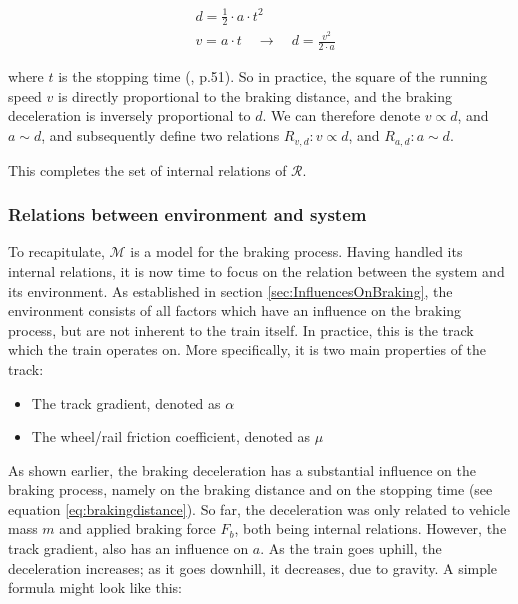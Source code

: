 \begin{equation}
\label{eq:brakingdistance}
\begin{aligned}
&d=\frac{1}{2} \cdot a \cdot t^{2} \\
&v=a \cdot t \quad \rightarrow \quad d=\frac{v^{2}}{2 \cdot a}
\end{aligned}
\end{equation}

\noindent
where $t$ is the stopping time (\cite{Cruceanu2012}, p.51). So in practice, the square of the running speed $v$ is directly proportional to the braking distance, and the braking deceleration is inversely proportional to $d$. We can therefore denote $v \propto d$, and $a \sim d$, and subsequently define two relations $R_{v,d}: v \propto d$, and $R_{a,d}: a \sim d$.
\par
This completes the set of internal relations of ${\mathcal{R}}$.

\subsubsection{Relations between environment and system}
\label{sec:RelationsEnvironmentSystem}
\par\noindent
To recapitulate, ${\mathcal{M}}$ is a model for the braking process. Having handled its internal relations, it is now time to focus on the relation between the system and its environment. As established in section \ref{sec:InfluencesOnBraking}, the environment consists of all factors which have an influence on the braking process, but are not inherent to the train itself. In practice, this is the track which the train operates on. More specifically, it is two main properties of the track:
\begin{itemize}
	\item The track gradient, denoted as $\alpha$
	\item The wheel/rail friction coefficient, denoted as $\mu$
\end{itemize}
\noindent
As shown earlier, the braking deceleration has a substantial influence on the braking process, namely on the braking distance and on the stopping time (see equation \ref{eq:brakingdistance}). So far, the deceleration was only related to vehicle mass $m$ and applied braking force $F_{b}$, both being internal relations. However, the track gradient, also has an influence on $a$. As the train goes uphill, the deceleration increases; as it goes downhill, it decreases, due to gravity. A simple formula might look like this:

